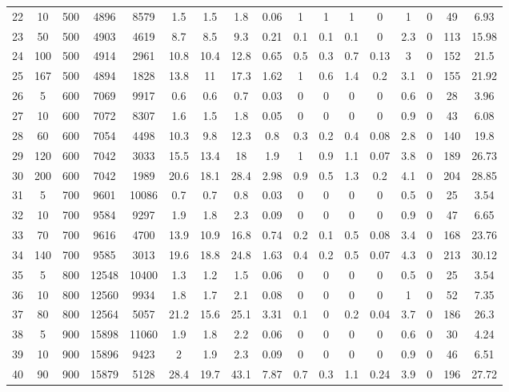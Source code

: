 \documentclass[11pt]{article}
\begin{document}
\begin{landscape}
\begin{longtable}[c]{ccccc|cccc|cccc|cccc}
		\rowcolor[HTML]{EFEFEF} 
		22 & 10 & 500 & 4896 & 8579 & 1.5 & 1.5 & 1.8 & 0.06 & 1 & 1 & 1 & 0 & 1 & 0 & 49 & 6.93 \\
		\rowcolor[HTML]{EFEFEF} 
		23 & 50 & 500 & 4903 & 4619 & 8.7 & 8.5 & 9.3 & 0.21 & 0.1 & 0.1 & 0.1 & 0 & 2.3 & 0 & 113 & 15.98 \\
		\rowcolor[HTML]{EFEFEF} 
		24 & 100 & 500 & 4914 & 2961 & 10.8 & 10.4 & 12.8 & 0.65 & 0.5 & 0.3 & 0.7 & 0.13 & 3 & 0 & 152 & 21.5 \\
		\rowcolor[HTML]{EFEFEF} 
		25 & 167 & 500 & 4894 & 1828 & 13.8 & 11 & 17.3 & 1.62 & 1 & 0.6 & 1.4 & 0.2 & 3.1 & 0 & 155 & 21.92 \\
		26 & 5 & 600 & 7069 & 9917 & 0.6 & 0.6 & 0.7 & 0.03 & 0 & 0 & 0 & 0 & 0.6 & 0 & 28 & 3.96 \\
		27 & 10 & 600 & 7072 & 8307 & 1.6 & 1.5 & 1.8 & 0.05 & 0 & 0 & 0 & 0 & 0.9 & 0 & 43 & 6.08 \\
		28 & 60 & 600 & 7054 & 4498 & 10.3 & 9.8 & 12.3 & 0.8 & 0.3 & 0.2 & 0.4 & 0.08 & 2.8 & 0 & 140 & 19.8 \\
		29 & 120 & 600 & 7042 & 3033 & 15.5 & 13.4 & 18 & 1.9 & 1 & 0.9 & 1.1 & 0.07 & 3.8 & 0 & 189 & 26.73 \\
		30 & 200 & 600 & 7042 & 1989 & 20.6 & 18.1 & 28.4 & 2.98 & 0.9 & 0.5 & 1.3 & 0.2 & 4.1 & 0 & 204 & 28.85 \\
		\rowcolor[HTML]{EFEFEF} 
		31 & 5 & 700 & 9601 & 10086 & 0.7 & 0.7 & 0.8 & 0.03 & 0 & 0 & 0 & 0 & 0.5 & 0 & 25 & 3.54 \\
		\rowcolor[HTML]{EFEFEF} 
		32 & 10 & 700 & 9584 & 9297 & 1.9 & 1.8 & 2.3 & 0.09 & 0 & 0 & 0 & 0 & 0.9 & 0 & 47 & 6.65 \\
		\rowcolor[HTML]{EFEFEF} 
		33 & 70 & 700 & 9616 & 4700 & 13.9 & 10.9 & 16.8 & 0.74 & 0.2 & 0.1 & 0.5 & 0.08 & 3.4 & 0 & 168 & 23.76 \\
		\rowcolor[HTML]{EFEFEF} 
		34 & 140 & 700 & 9585 & 3013 & 19.6 & 18.8 & 24.8 & 1.63 & 0.4 & 0.2 & 0.5 & 0.07 & 4.3 & 0 & 213 & 30.12 \\
		\rowcolor[HTML]{EFEFEF} 
		35 & 5 & 800 & 12548 & 10400 & 1.3 & 1.2 & 1.5 & 0.06 & 0 & 0 & 0 & 0 & 0.5 & 0 & 25 & 3.54 \\
		36 & 10 & 800 & 12560 & 9934 & 1.8 & 1.7 & 2.1 & 0.08 & 0 & 0 & 0 & 0 & 1 & 0 & 52 & 7.35 \\
		37 & 80 & 800 & 12564 & 5057 & 21.2 & 15.6 & 25.1 & 3.31 & 0.1 & 0 & 0.2 & 0.04 & 3.7 & 0 & 186 & 26.3 \\
		\rowcolor[HTML]{EFEFEF} 
		38 & 5 & 900 & 15898 & 11060 & 1.9 & 1.8 & 2.2 & 0.06 & 0 & 0 & 0 & 0 & 0.6 & 0 & 30 & 4.24 \\
		\rowcolor[HTML]{EFEFEF} 
		39 & 10 & 900 & 15896 & 9423 & 2 & 1.9 & 2.3 & 0.09 & 0 & 0 & 0 & 0 & 0.9 & 0 & 46 & 6.51 \\
		\rowcolor[HTML]{EFEFEF} 
		40 & 90 & 900 & 15879 & 5128 & 28.4 & 19.7 & 43.1 & 7.87 & 0.7 & 0.3 & 1.1 & 0.24 & 3.9 & 0 & 196 & 27.72
	\end{longtable}
\end{landscape}
	
\end{document}
